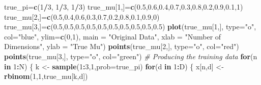 \documentclass[]{article}
\newenvironment{Shaded}{\begin{snugshade}}{\end{snugshade}}
\newcommand{\CommentTok}[1]{\textcolor[rgb]{0.56,0.35,0.01}{\textit{#1}}}
\newcommand{\ControlFlowTok}[1]{\textcolor[rgb]{0.13,0.29,0.53}{\textbf{#1}}}
\newcommand{\DataTypeTok}[1]{\textcolor[rgb]{0.13,0.29,0.53}{#1}}
\newcommand{\DecValTok}[1]{\textcolor[rgb]{0.00,0.00,0.81}{#1}}
\newcommand{\FloatTok}[1]{\textcolor[rgb]{0.00,0.00,0.81}{#1}}
\newcommand{\KeywordTok}[1]{\textcolor[rgb]{0.13,0.29,0.53}{\textbf{#1}}}
\newcommand{\NormalTok}[1]{#1}
\newcommand{\OperatorTok}[1]{\textcolor[rgb]{0.81,0.36,0.00}{\textbf{#1}}}
\newcommand{\StringTok}[1]{\textcolor[rgb]{0.31,0.60,0.02}{#1}}
\begin{document}
\begin{Shaded}
\begin{Highlighting}[]
\NormalTok{true_pi=}\KeywordTok{c}\NormalTok{(}\DecValTok{1}\OperatorTok{/}\DecValTok{3}\NormalTok{, }\DecValTok{1}\OperatorTok{/}\DecValTok{3}\NormalTok{, }\DecValTok{1}\OperatorTok{/}\DecValTok{3}\NormalTok{)}
\NormalTok{true_mu[}\DecValTok{1}\NormalTok{,]=}\KeywordTok{c}\NormalTok{(}\FloatTok{0.5}\NormalTok{,}\FloatTok{0.6}\NormalTok{,}\FloatTok{0.4}\NormalTok{,}\FloatTok{0.7}\NormalTok{,}\FloatTok{0.3}\NormalTok{,}\FloatTok{0.8}\NormalTok{,}\FloatTok{0.2}\NormalTok{,}\FloatTok{0.9}\NormalTok{,}\FloatTok{0.1}\NormalTok{,}\DecValTok{1}\NormalTok{)}
\NormalTok{true_mu[}\DecValTok{2}\NormalTok{,]=}\KeywordTok{c}\NormalTok{(}\FloatTok{0.5}\NormalTok{,}\FloatTok{0.4}\NormalTok{,}\FloatTok{0.6}\NormalTok{,}\FloatTok{0.3}\NormalTok{,}\FloatTok{0.7}\NormalTok{,}\FloatTok{0.2}\NormalTok{,}\FloatTok{0.8}\NormalTok{,}\FloatTok{0.1}\NormalTok{,}\FloatTok{0.9}\NormalTok{,}\DecValTok{0}\NormalTok{)}
\NormalTok{true_mu[}\DecValTok{3}\NormalTok{,]=}\KeywordTok{c}\NormalTok{(}\FloatTok{0.5}\NormalTok{,}\FloatTok{0.5}\NormalTok{,}\FloatTok{0.5}\NormalTok{,}\FloatTok{0.5}\NormalTok{,}\FloatTok{0.5}\NormalTok{,}\FloatTok{0.5}\NormalTok{,}\FloatTok{0.5}\NormalTok{,}\FloatTok{0.5}\NormalTok{,}\FloatTok{0.5}\NormalTok{,}\FloatTok{0.5}\NormalTok{)}
\KeywordTok{plot}\NormalTok{(true_mu[}\DecValTok{1}\NormalTok{,],}
     \DataTypeTok{type=}\StringTok{"o"}\NormalTok{,}
     \DataTypeTok{col=}\StringTok{"blue"}\NormalTok{,}
     \DataTypeTok{ylim=}\KeywordTok{c}\NormalTok{(}\DecValTok{0}\NormalTok{,}\DecValTok{1}\NormalTok{),}
     \DataTypeTok{main =} \StringTok{"Original Data"}\NormalTok{,}
     \DataTypeTok{xlab =} \StringTok{"Number of Dimensions"}\NormalTok{,}
     \DataTypeTok{ylab =} \StringTok{"True Mu"}\NormalTok{)}
\KeywordTok{points}\NormalTok{(true_mu[}\DecValTok{2}\NormalTok{,], }\DataTypeTok{type=}\StringTok{"o"}\NormalTok{, }\DataTypeTok{col=}\StringTok{"red"}\NormalTok{)}
\KeywordTok{points}\NormalTok{(true_mu[}\DecValTok{3}\NormalTok{,], }\DataTypeTok{type=}\StringTok{"o"}\NormalTok{, }\DataTypeTok{col=}\StringTok{"green"}\NormalTok{)}
\CommentTok{# Producing the training data}
\ControlFlowTok{for}\NormalTok{(n }\ControlFlowTok{in} \DecValTok{1}\OperatorTok{:}\NormalTok{N) \{}
\NormalTok{  k <-}\StringTok{ }\KeywordTok{sample}\NormalTok{(}\DecValTok{1}\OperatorTok{:}\DecValTok{3}\NormalTok{,}\DecValTok{1}\NormalTok{,}\DataTypeTok{prob=}\NormalTok{true_pi)}
  \ControlFlowTok{for}\NormalTok{(d }\ControlFlowTok{in} \DecValTok{1}\OperatorTok{:}\NormalTok{D) \{}
\NormalTok{    x[n,d] <-}\StringTok{ }\KeywordTok{rbinom}\NormalTok{(}\DecValTok{1}\NormalTok{,}\DecValTok{1}\NormalTok{,true_mu[k,d])}

\end{Highlighting}
\end{Shaded}
\end{document}
